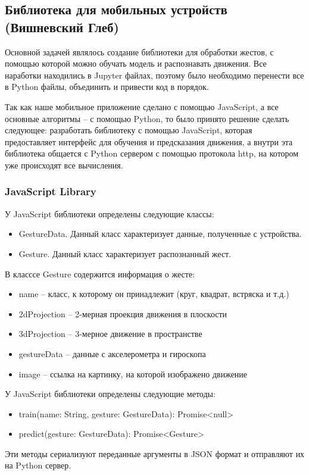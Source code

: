 \subsection{Библиотека для мобильных устройств (Вишневский Глеб)}

Основной задачей являлось создание библиотеки для обработки жестов, с помощью которой можно обучать модель и распознавать движения. Все наработки находились в Jupyter файлах, поэтому было необходимо перенести все в Python файлы, объединить и привести код в порядок. \newline

Так как наше мобильное приложение сделано с помощью JavaScript, а все основные алгоритмы – с помощью Python, то было принято решение сделать следующее: разработать библиотеку с помощью JavaScript, которая предоставляет интерфейс для обучения и предсказания движения, а внутри эта библиотека общается с Python сервером с помощью протокола http, на котором уже происходят все вычисления.

\subsubsection{JavaScript Library}
У JavaScript библиотеки определены следующие классы:
\begin{itemize}
  \item GestureData. Данный класс характеризует данные, полученные с устройства.
  \item Gesture. Данный класс характеризует распознанный жест.
\end{itemize}
В класссе Gesture содержится информация о жесте:
\begin{itemize}
  \item name -- класс, к которому он принадлежит (круг, квадрат, встряска и т.д.)
  \item 2dProjection -- 2-мерная проекция движения в плоскости
  \item 3dProjection -- 3-мерное движение в пространстве
  \item gestureData -- данные с акселерометра и гироскопа
  \item image -- ссылка на картинку, на которой изображено движение
\end{itemize}

У JavaScript библиотеки определены следующие методы:
\begin{itemize}
  \item train(name: String, gesture: GestureData): Promise<null> {} 
  \item predict(gesture: GestureData): Promise<Gesture> {}
\end{itemize}
Эти методы сериализуют переданные аргументы в JSON формат и отправляют их на Python сервер.



